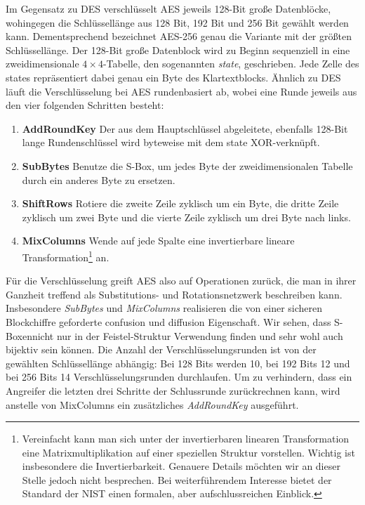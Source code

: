 Im Gegensatz zu DES verschlüsselt AES jeweils 128-Bit große Datenblöcke,
wohingegen die Schlüssellänge aus 128 Bit, 192 Bit und 256 Bit gewählt
werden kann. Dementsprechend bezeichnet AES-256 genau die Variante mit
der größten Schlüssellänge. Der 128-Bit große Datenblock wird zu Beginn
sequenziell in eine zweidimensionale $4 \times 4$-Tabelle, den
sogenannten \emph{state}, geschrieben. Jede Zelle des states
repräsentiert dabei genau ein Byte des Klartextblocks. Ähnlich zu DES
läuft die Verschlüsselung bei AES rundenbasiert ab, wobei eine Runde
jeweils aus den vier folgenden Schritten besteht:

\begin{enumerate}
  \small
\item \textbf{AddRoundKey} Der aus dem Hauptschlüssel abgeleitete,
  ebenfalls 128-Bit lange Rundenschlüssel wird byteweise mit dem state
  XOR-verknüpft. 
\item \textbf{SubBytes} Benutze die S-Box, um jedes Byte der
  zweidimensionalen Tabelle durch ein anderes Byte zu ersetzen. 
\item \textbf{ShiftRows} Rotiere die zweite Zeile zyklisch um ein Byte,
  die dritte Zeile zyklisch um zwei Byte und die vierte Zeile zyklisch
  um drei Byte nach links. 
\item \textbf{MixColumns} Wende auf jede Spalte eine invertierbare
  lineare Transformation\footnote{Vereinfacht kann man sich unter der
    invertierbaren linearen Transformation eine Matrixmultiplikation auf
    einer speziellen Struktur vorstellen. Wichtig ist insbesondere die
    Invertierbarkeit. Genauere Details möchten wir an dieser Stelle
    jedoch nicht besprechen. Bei weiterführendem Interesse bietet der
    Standard der NIST \cite{NIST_AES01} einen formalen, aber
    aufschlussreichen Einblick.} an. 
\end{enumerate}

Für die Verschlüsselung greift AES also auf Operationen zurück, die man
in ihrer Ganzheit treffend als Substitutions- und Rotationsnetzwerk
beschreiben kann. Insbesondere \textit{SubBytes} und \textit{MixColumns}
realisieren die von einer sicheren Blockchiffre geforderte confusion und
diffusion Eigenschaft. Wir sehen, dass S-Boxen\indexSBOX nicht nur in
der Feistel-Struktur Verwendung finden und sehr wohl auch bijektiv sein
können. 
Die Anzahl der Verschlüsselungsrunden ist von der gewählten
Schlüssellänge abhängig: Bei 128 Bits werden 10, bei 192 Bits 12 und bei
256 Bits 14 Verschlüsselungsrunden durchlaufen. Um zu verhindern, dass
ein Angreifer die letzten drei Schritte der Schlussrunde zurückrechnen
kann, wird anstelle von MixColumns ein zusätzliches \textit{AddRoundKey}
ausgeführt. 

